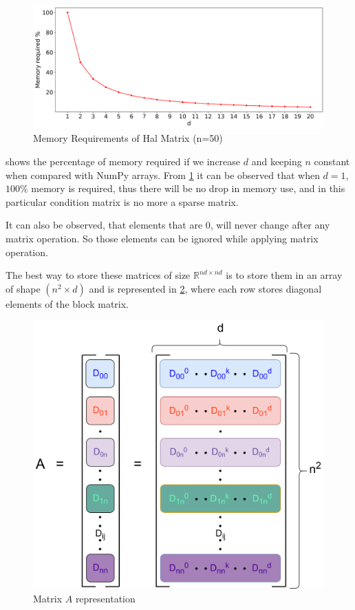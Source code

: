 \documentclass[11pt,twocolumn]{article}
\begin{document}
    \begin{figure}[H]
        \includegraphics[width=\linewidth]{graphs/memory2.png}
        \caption{Memory Requirements of Hal Matrix (n=50)}
        \label{img:memory}    
    \end{figure}

     shows the percentage of memory required if we increase $d$ and keeping $n$ constant when compared with NumPy arrays. From \cref{img:memory} it can be observed that when $d=1$, $100\%$ memory is required, thus there will be no drop in memory use, and in this particular condition matrix is no more a sparse matrix.

    It can also be observed, that elements that are $0$, will never change after any matrix operation. So those elements can be ignored while applying matrix operation.

    The best way to store these matrices of size $\mathbb{R}^{nd \times nd}$ is to store them in an array of shape $(n^2 \times d)$ and is represented in \cref{img:representation}, where each row stores diagonal elements of the block matrix.
    
    \begin{figure}[htbp]
        \centering
        \includegraphics[width=0.8\linewidth]{images/representation.png}
        \caption{Matrix $A$ representation}
        \label{img:representation}    
    \end{figure}
\end{document}
